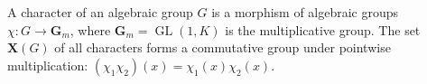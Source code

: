 A character of an algebraic group $G$ is a morphism of algebraic groups $\chi: G \to \mathbf{G}_m$, where $\mathbf{G}_m = \operatorname{GL}(1, K)$ is the multiplicative group. The set $\mathbf{X}(G)$ of all characters forms a commutative group under pointwise multiplication: $(\chi_1 \chi_2)(x) = \chi_1(x) \chi_2(x)$.
